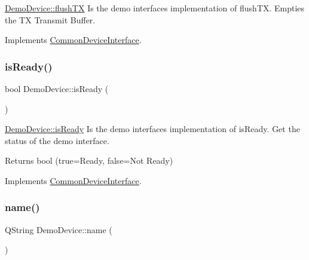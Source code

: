 \hyperlink{class_demo_device_a32e89c17f613abfa7f2a4d9f970bbffe}{Demo\+Device\+::flush\+TX} Is the demo interface\textquotesingle{}s implementation of flush\+TX. Empties the TX Transmit Buffer. 



Implements \hyperlink{class_common_device_interface_a45edc68596f002f0765740ee14b39b77}{Common\+Device\+Interface}.

\hypertarget{class_demo_device_aaadb9ced56699af55526b9fc7cf8420c}{}\label{class_demo_device_aaadb9ced56699af55526b9fc7cf8420c} 
\subsubsection{\texorpdfstring{is\+Ready()}{isReady()}}
{\footnotesize\ttfamily bool Demo\+Device\+::is\+Ready (\begin{DoxyParamCaption}{ }\end{DoxyParamCaption})\hspace{0.3cm}{\ttfamily [virtual]}}



\hyperlink{class_demo_device_aaadb9ced56699af55526b9fc7cf8420c}{Demo\+Device\+::is\+Ready} Is the demo interface\textquotesingle{}s implementation of is\+Ready. Get the status of the demo interface. 

\begin{DoxyReturn}{Returns}
bool (true=Ready, false=Not Ready) 
\end{DoxyReturn}


Implements \hyperlink{class_common_device_interface_ae58207ead16a77fa94babe01f0a3ba40}{Common\+Device\+Interface}.

\hypertarget{class_demo_device_acde538bd5a71a8d4df6293876169545c}{}\label{class_demo_device_acde538bd5a71a8d4df6293876169545c} 
\subsubsection{\texorpdfstring{name()}{name()}}
{\footnotesize\ttfamily Q\+String Demo\+Device\+::name (\begin{DoxyParamCaption}{ }\end{DoxyParamCaption})\hspace{0.3cm}{\ttfamily [virtual]}}



